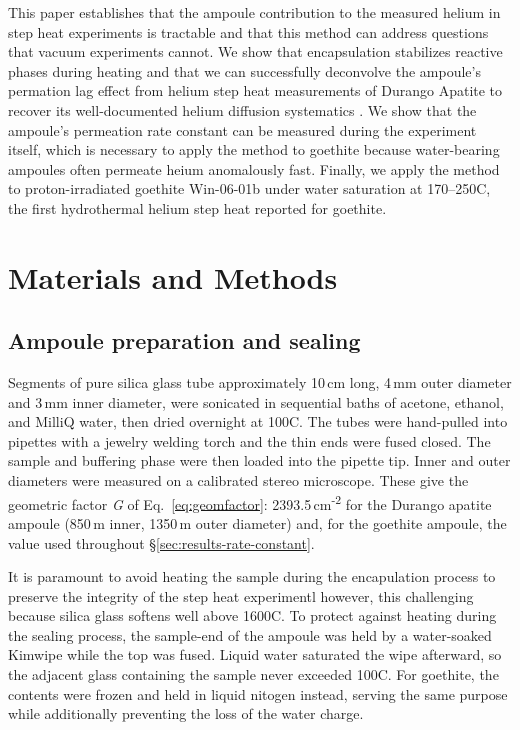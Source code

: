 This paper establishes that the ampoule contribution to the measured helium in step heat experiments is tractable and that this method can address questions that vacuum experiments cannot. We show that encapsulation stabilizes reactive phases during heating and that we can successfully deconvolve the ampoule's permation lag effect from helium step heat measurements of Durango Apatite to recover its well-documented helium diffusion systematics \citep{wolf1998, farley2000}. We show that the ampoule's permeation rate constant can be measured during the experiment itself, which is necessary to apply the method to goethite because water-bearing ampoules often permeate heium anomalously fast. Finally, we apply the method to proton-irradiated goethite Win-06-01b under water saturation at 170--250\textdegree C, the first hydrothermal helium step heat reported for goethite.

\section{Materials and Methods}\label{sec:methods}

\subsection{Ampoule preparation and sealing}\label{sec:ampoule-prep}

Segments of pure silica glass tube approximately 10\,cm long, 4\,mm outer diameter and 3\,mm inner diameter, were sonicated in sequential baths of acetone, ethanol, and MilliQ water, then dried overnight at 100\textdegree C. The tubes were hand-pulled into pipettes with a jewelry welding torch and the thin ends were fused closed. The sample and buffering phase were then loaded into the pipette tip. Inner and outer diameters were measured on a calibrated stereo microscope. These give the geometric factor \emph{G} of Eq.~\eqref{eq:geomfactor}: 2393.5\,cm\textsuperscript{-2} for the Durango apatite ampoule (850\,\textmu m inner, 1350\,\textmu m outer diameter) and, for the goethite ampoule, the value used throughout \S\ref{sec:results-rate-constant}.

It is paramount to avoid heating the sample during the encapulation process to preserve the integrity of the step heat experimentl however, this challenging because silica glass softens well above 1600\textdegree C. To protect against heating during the sealing process, the sample-end of the ampoule was held by a water-soaked Kimwipe while the top was fused. Liquid water saturated the wipe afterward, so the adjacent glass containing the sample never exceeded 100\textdegree C. For goethite, the contents were frozen and held in liquid nitogen instead, serving the same purpose while additionally preventing the loss of the water charge.

